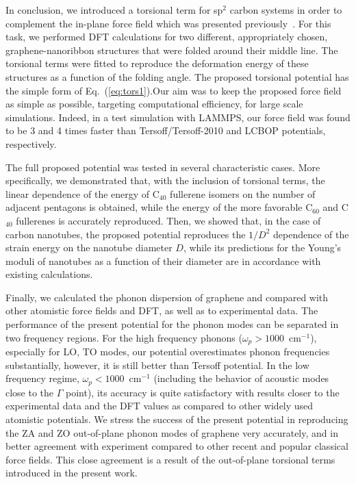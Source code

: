 \documentclass[aps,prb,floatfix,twocolumn,showpacs]{revtex4}
\begin{document}
In conclusion, we introduced a torsional term for sp$^2$ carbon systems in order to complement
the in-plane force field which was presented previously~\cite{kalosakas}. For this task, we 
performed DFT calculations for two different, appropriately chosen, graphene-nanoribbon structures 
that were folded around their middle line. The torsional terms were fitted to reproduce the 
deformation energy of these structures as a function of the folding angle. 
The proposed torsional potential has the simple form of Eq.~(\ref{eq:tors1}).Our aim was to keep the
proposed force field as simple as possible, targeting computational efficiency, for large scale
simulations. Indeed, in a test simulation with LAMMPS, our force field was found 
to be 3 and 4 times faster than Tersoff/Tersoff-2010 and LCBOP potentials, respectively.

The full proposed potential was tested in several characteristic cases. More specifically, we demonstrated that, with the
inclusion of torsional terms, the linear dependence of the energy of C$_{40}$ fullerene isomers on the
number of adjacent pentagons is obtained, while the energy of the more favorable C$_{60}$
and C$_{40}$ fullerenes is accurately reproduced.
Then, we showed that, in the case of carbon nanotubes, the proposed potential reproduces the 
$1/D^2$ dependence of the strain energy on the nanotube diameter $D$, while its predictions for the
Young's moduli of nanotubes as a function of their diameter are in accordance with existing calculations. 

Finally, we calculated the phonon dispersion of graphene and compared with other atomistic force fields and
DFT, as well as to experimental data.
The performance of the present potential for the phonon modes can be separated in two 
frequency regions. For the high frequency phonons ($\omega_p> 1000$~cm$^{-1}$), especially for LO, 
TO modes, our potential overestimates phonon frequencies substantially, however, it is still better than Tersoff potential.
In the low frequency regime, $\omega_p< 1000$~cm$^{-1}$ (including the
behavior of acoustic modes close to the $\Gamma$ point),
its accuracy is quite satisfactory with results closer to the experimental data and the DFT values
as compared to other widely used atomistic potentials. We stress the 
success of the present potential in reproducing the ZA and ZO out-of-plane phonon modes of 
graphene very accurately, and in better agreement with experiment compared to other recent
and popular classical force fields. This close agreement is a result of
the out-of-plane torsional terms introduced in the present work. 
\end{document}
